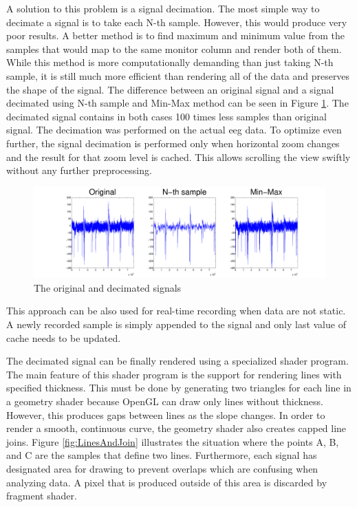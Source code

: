 A solution to this problem is a signal decimation. The most simple way to decimate a signal is to take each N-th sample. However, this would produce very poor results. A better method is to find maximum and minimum value from the samples that would map to the same monitor column and render both of them. While this method is more computationally demanding than just taking N-th sample, it is still much more efficient than rendering all of the data and preserves the shape of the signal. The difference between an original signal and a signal decimated using N-th sample and Min-Max method can be seen in Figure \ref{fig:SignalDecimation}. The decimated signal contains in both cases 100 times less samples than original signal. The decimation was performed on the actual \gls{eeg} data. To optimize even further, the signal decimation is performed only when horizontal zoom changes and the result for that zoom level is cached. This allows scrolling the view swiftly without any further preprocessing.
\begin{figure}[htb]
	\centering
	\includegraphics[width=1\linewidth]{fig/signalDec.pdf}
	\caption{The original and decimated signals}
	\label{fig:SignalDecimation}
\end{figure}
This approach can be also used for real-time recording when data are not static. A newly recorded sample is simply appended to the signal and only last value of cache needs to be updated.  

The decimated signal can be finally rendered using a specialized shader program. The main feature of this shader program is the support for rendering lines with specified thickness. This must be done by generating two triangles for each line in a geometry shader because OpenGL can draw only lines without thickness. However, this produces gaps between lines as the slope changes. In order to render a smooth, continuous curve, the geometry shader also creates capped line joins. Figure \ref{fig:LinesAndJoin} illustrates the situation where the points A, B, and C are the samples that define two lines. Furthermore, each signal has designated area for drawing to prevent overlaps which are confusing when analyzing data. A pixel that is produced outside of this area is discarded by fragment shader.

